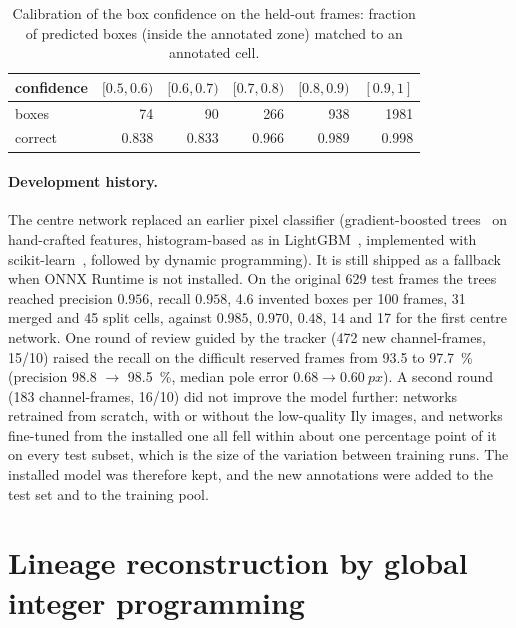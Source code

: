 \documentclass[11pt,a4paper]{article}
\begin{document}
\begin{table}[ht]
\centering\small
\caption{Calibration of the box confidence on the held-out frames: fraction of predicted boxes (inside the annotated zone) matched to an annotated cell.}
\label{tab:calib}
\begin{tabular}{@{}lrrrrr@{}}
\toprule
confidence & $[0.5,0.6)$ & $[0.6,0.7)$ & $[0.7,0.8)$ & $[0.8,0.9)$ & $[0.9,1]$\\
\midrule
boxes & 74 & 90 & 266 & 938 & 1981\\
correct & 0.838 & 0.833 & 0.966 & 0.989 & 0.998\\
\bottomrule
\end{tabular}
\end{table}

\paragraph{Development history.} The centre network replaced an earlier pixel classifier (gradient-boosted trees~\cite{friedman2001} on hand-crafted features, histogram-based as in LightGBM~\cite{ke2017}, implemented with scikit-learn~\cite{pedregosa2011}, followed by dynamic programming). It is still shipped as a fallback when ONNX Runtime is not installed. On the original 629 test frames the trees reached precision $0.956$, recall $0.958$, 4.6 invented boxes per 100 frames, 31 merged and 45 split cells, against $0.985$, $0.970$, $0.48$, 14 and 17 for the first centre network. One round of review guided by the tracker (472 new channel-frames, 15/10) raised the recall on the difficult reserved frames from \SI{93.5}{} to \SI{97.7}{\percent} (precision \SI{98.8}{} $\to$ \SI{98.5}{\percent}, median pole error $0.68\to\SI{0.60}{px}$). A second round (183 channel-frames, 16/10) did not improve the model further: networks retrained from scratch, with or without the low-quality Ily images, and networks fine-tuned from the installed one all fell within about one percentage point of it on every test subset, which is the size of the variation between training runs. The installed model was therefore kept, and the new annotations were added to the test set and to the training pool.

\section{Lineage reconstruction by global integer programming}\label{sec:tracking}
\end{document}
